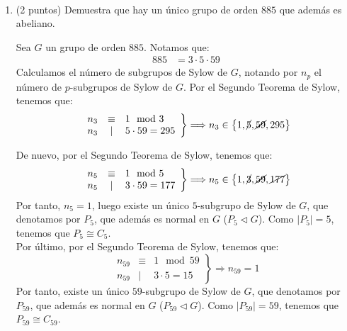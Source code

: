 \documentclass[12pt]{article}
\begin{document}
    \begin{ejercicio}~
        \begin{enumerate}
            \item (2 puntos) Demuestra que hay un único grupo de orden $885$ que además es abeliano.
            
            Sea $G$ un grupo de orden $885$. Notamos que:
            \begin{align*}
                885 & = 3\cdot 5\cdot 59
            \end{align*}
            Calculamos el número de subgrupos de Sylow de $G$, notando por $n_p$ el número de $p$-subgrupos de Sylow de $G$. Por el Segundo Teorema de Sylow, tenemos que:
            \begin{equation*}
                \left.\begin{array}{rcl}
                    n_3 & \equiv & 1 \mod 3 \\
                    n_3 & \mid & 5\cdot 59 = 295
                \end{array}\right\}
                \Longrightarrow n_3 \in \left\{1,\cancel{5},\cancel{59},295\right\}
            \end{equation*}

            De nuevo, por el Segundo Teorema de Sylow, tenemos que:
            \begin{equation*}
                \left.\begin{array}{rcl}
                    n_5 & \equiv & 1 \mod 5 \\
                    n_5 & \mid & 3\cdot 59 = 177
                \end{array}\right\}
                \Longrightarrow n_5 \in \left\{1,\cancel{3},\cancel{59},\cancel{177}\right\}
            \end{equation*}
            Por tanto, $n_5=1$, luego existe un único $5$-subgrupo de Sylow de $G$, que denotamos por $P_5$, que además es normal en $G$ ($P_5 \lhd G$). Como $|P_5|=5$, tenemos que $P_5 \cong C_5$.\\

            Por último, por el Segundo Teorema de Sylow, tenemos que:
            \begin{equation*}
                \left.\begin{array}{rcl}
                    n_{59} & \equiv & 1 \mod 59 \\
                    n_{59} & \mid & 3\cdot 5 = 15
                \end{array}\right\}
                \Longrightarrow n_{59}=1
            \end{equation*}
            Por tanto, existe un único $59$-subgrupo de Sylow de $G$, que denotamos por $P_{59}$, que además es normal en $G$ ($P_{59} \lhd G$). Como $|P_{59}|=59$, tenemos que $P_{59} \cong C_{59}$.\\


\end{enumerate}
\end{ejercicio}
\end{document}
